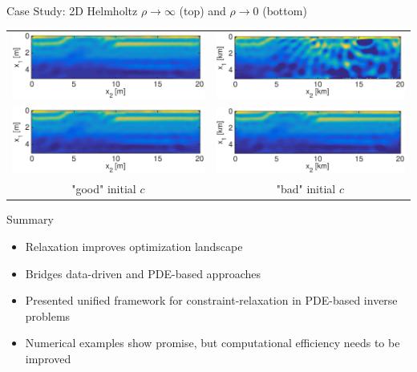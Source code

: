 \documentclass{beamer}
\begin{document}
\begin{frame}{Case Study: 2D Helmholtz}
\centering
$\rho\rightarrow \infty$ (top) and $\rho\rightarrow 0$ (bottom)
\begin{tabular}{cc}
\includegraphics[scale=0.3]{./figs/2D_overthrust1_g.eps}&
\includegraphics[scale=0.3]{./figs/2D_overthrust2_g.eps}\\
\includegraphics[scale=0.3]{./figs/2D_overthrust1_h.eps}&
\includegraphics[scale=0.3]{./figs/2D_overthrust2_h.eps}\\
"good" initial $c$ & "bad" initial $c$
\end{tabular}
\end{frame}

\begin{frame}{Summary}
\begin{itemize}
  \item Relaxation improves optimization landscape
  \item Bridges data-driven and PDE-based approaches
  \item Presented unified framework for constraint-relaxation in PDE-based inverse problems
  \item Numerical examples show promise, but computational efficiency needs to be improved
\end{itemize}
\end{frame}
\end{document}
